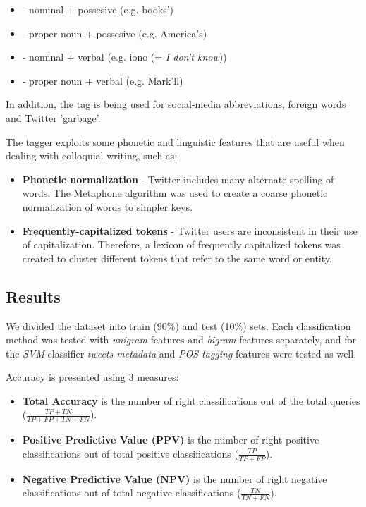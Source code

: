 \documentclass[letterpaper,twocolumn,10pt]{article}
\begin{document}
\begin{itemize}[noitemsep, nolistsep]
	\item \textbf{} - nominal + possesive (e.g. books')
	\item \textbf{} - proper noun + possesive (e.g. America's)
	\item \textbf{} - nominal + verbal (e.g. iono (= \textit{I don't know}))
	\item \textbf{} - proper noun + verbal (e.g. Mark'll)
\end{itemize}

In addition, the tag \textbf{} is being used for social-media abbreviations, foreign words and Twitter 'garbage'.

The tagger exploits some phonetic and linguistic features that are useful when dealing with colloquial writing, such as:

\begin{itemize}[noitemsep, nolistsep]
	\item \textbf{Phonetic normalization} - Twitter includes many alternate spelling of words. The Metaphone algorithm was used to create a coarse phonetic normalization of words to simpler keys.
	\item \textbf{Frequently-capitalized tokens} - Twitter users are inconsistent in their use of capitalization. Therefore, a lexicon of frequently capitalized tokens was created to cluster different tokens that refer to the same word or entity.
\end{itemize}


\subsection{Results}
We divided the dataset into train (90\%) and test (10\%) sets. Each classification method was tested with \textit{unigram} features and \textit{bigram} features separately, and for the \textit{SVM} classifier \textit{tweets metadata} and \textit{POS tagging} features were tested as well.

Accuracy is presented using 3 measures:

\begin{itemize}[noitemsep, nolistsep]
	\item \textbf{Total Accuracy} is the number of right classifications out of the total queries ($ \frac{TP + TN}{TP + FP + TN + FN } $).
	\item \textbf{Positive Predictive Value (PPV)} is the number of right positive classifications out of total positive classifications ($ \frac{TP}{TP + FP} $).
	\item \textbf{Negative Predictive Value (NPV)} is the number of right negative classifications out of total negative classifications ($ \frac{TN}{TN + FN} $).
\end{itemize}
\end{document}
